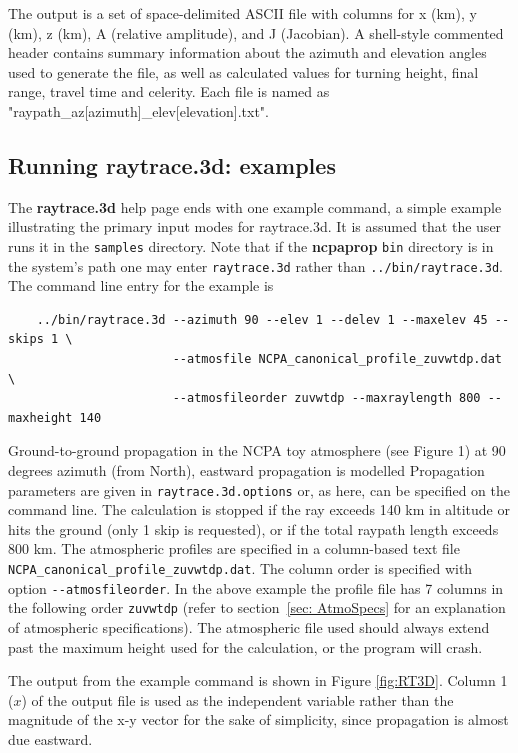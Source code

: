 The output is a set of space-delimited ASCII file with columns for x (km), y (km), z (km), A (relative amplitude), and J (Jacobian).  A shell-style commented header contains summary information about the azimuth and elevation angles used to generate the file, as well as calculated values for turning height, final range, travel time and celerity.  Each file is named as "raypath\_az[azimuth]\_elev[elevation].txt".  

\subsection{Running raytrace.3d: examples}
\label{sec: raytrace.3d examples}

The \textbf{raytrace.3d} help page ends with one example command, a simple example illustrating the primary input modes for raytrace.3d. It is assumed that the user runs it in the \verb+samples+ directory. Note that if the \textbf{ncpaprop} \verb+bin+ directory is in the system's path one may enter \verb+raytrace.3d+ rather than \verb+../bin/raytrace.3d+. The command line entry for the example is 
\begin{verbatim} 
    ../bin/raytrace.3d --azimuth 90 --elev 1 --delev 1 --maxelev 45 --skips 1 \
                       --atmosfile NCPA_canonical_profile_zuvwtdp.dat \
                       --atmosfileorder zuvwtdp --maxraylength 800 --maxheight 140
\end{verbatim}


Ground-to-ground propagation in the NCPA toy atmosphere (see Figure 1) at 90 degrees azimuth (from North), eastward propagation is modelled Propagation parameters are given in \verb"raytrace.3d.options" or, as here, can be specified on the command line. The calculation is stopped if the ray exceeds 140 km in altitude or hits the ground (only 1 skip is requested), or if the total raypath length exceeds 800 km. The atmospheric profiles are specified in a column-based text file \verb"NCPA_canonical_profile_zuvwtdp.dat". The column order is specified with option \verb"--atmosfileorder". In the above example the profile file has 7 columns in the following order \verb"zuvwtdp" (refer to section~\ref{sec: AtmoSpecs}  for an explanation of atmospheric specifications).  The atmospheric file used should always extend past the maximum height used for the calculation, or the program will crash.

The output from the example command is shown in Figure \ref{fig:RT3D}. Column 1 ($x$) of the output file is used as the independent variable rather than the magnitude of the x-y vector for the sake of simplicity, since propagation is almost due eastward.\newline


